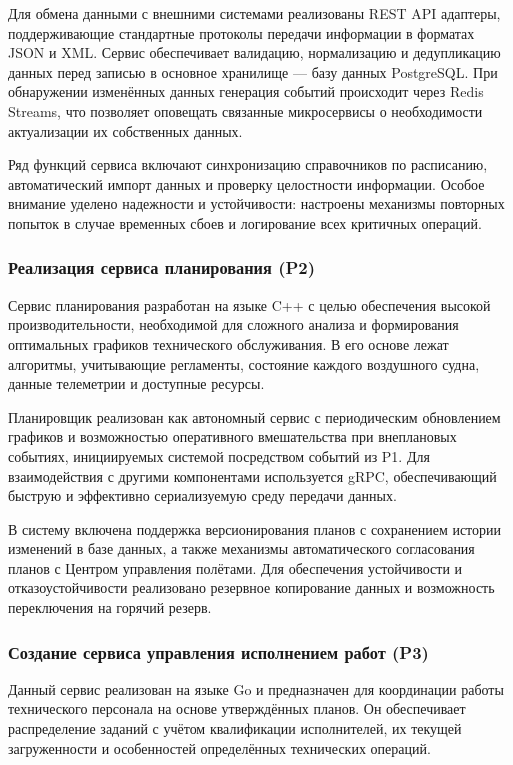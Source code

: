 \documentclass[14pt,a4paper]{extarticle}
\begin{document}
Для обмена данными с внешними системами реализованы REST API адаптеры, поддерживающие стандартные протоколы передачи информации в форматах JSON и XML. Сервис обеспечивает валидацию, нормализацию и дедупликацию данных перед записью в основное хранилище — базу данных PostgreSQL. При обнаружении изменённых данных генерация событий происходит через Redis Streams, что позволяет оповещать связанные микросервисы о необходимости актуализации их собственных данных.

Ряд функций сервиса включают синхронизацию справочников по расписанию, автоматический импорт данных и проверку целостности информации. Особое внимание уделено надежности и устойчивости: настроены механизмы повторных попыток в случае временных сбоев и логирование всех критичных операций.

\subsubsection{Реализация сервиса планирования (P2)}

Сервис планирования разработан на языке C++ с целью обеспечения высокой производительности, необходимой для сложного анализа и формирования оптимальных графиков технического обслуживания. В его основе лежат алгоритмы, учитывающие регламенты, состояние каждого воздушного судна, данные телеметрии и доступные ресурсы.

Планировщик реализован как автономный сервис с периодическим обновлением графиков и возможностью оперативного вмешательства при внеплановых событиях, инициируемых системой посредством событий из P1. Для взаимодействия с другими компонентами используется gRPC, обеспечивающий быструю и эффективно сериализуемую среду передачи данных.

В систему включена поддержка версионирования планов с сохранением истории изменений в базе данных, а также механизмы автоматического согласования планов с Центром управления полётами. Для обеспечения устойчивости и отказоустойчивости реализовано резервное копирование данных и возможность переключения на горячий резерв.

\subsubsection{Создание сервиса управления исполнением работ (P3)}

Данный сервис реализован на языке Go и предназначен для координации работы технического персонала на основе утверждённых планов. Он обеспечивает распределение заданий с учётом квалификации исполнителей, их текущей загруженности и особенностей определённых технических операций.
\end{document}
